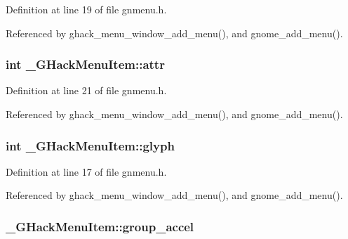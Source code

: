 Definition at line 19 of file gnmenu.\+h.



Referenced by ghack\+\_\+menu\+\_\+window\+\_\+add\+\_\+menu(), and gnome\+\_\+add\+\_\+menu().

\hypertarget{struct__GHackMenuItem_a3200e3f2ba0798dc63e0f7abe98652bd}{
\subsubsection[{attr}]{\setlength{\rightskip}{0pt plus 5cm}int \+\_\+\+G\+Hack\+Menu\+Item\+::attr}}\label{struct__GHackMenuItem_a3200e3f2ba0798dc63e0f7abe98652bd}


Definition at line 21 of file gnmenu.\+h.



Referenced by ghack\+\_\+menu\+\_\+window\+\_\+add\+\_\+menu(), and gnome\+\_\+add\+\_\+menu().

\hypertarget{struct__GHackMenuItem_acfcd2d3604cfa6ff4083472b493cbfb0}{
\subsubsection[{glyph}]{\setlength{\rightskip}{0pt plus 5cm}int \+\_\+\+G\+Hack\+Menu\+Item\+::glyph}}\label{struct__GHackMenuItem_acfcd2d3604cfa6ff4083472b493cbfb0}


Definition at line 17 of file gnmenu.\+h.



Referenced by ghack\+\_\+menu\+\_\+window\+\_\+add\+\_\+menu(), and gnome\+\_\+add\+\_\+menu().

\hypertarget{struct__GHackMenuItem_a3d933471459a6fa6e6ed39a630081b3c}{
\subsubsection[{group\+\_\+accel}]{ \+\_\+\+G\+Hack\+Menu\+Item\+::group\+\_\+accel}}\label{struct__GHackMenuItem_a3d933471459a6fa6e6ed39a630081b3c}


